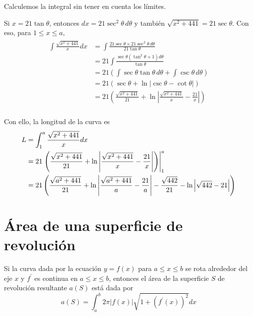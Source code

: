 Calculemos la integral sin tener en cuenta los límites.

Si $x=21\tan \theta$, entonces $dx=21\sec ^{2}\theta\,d\theta$ y también $\sqrt{x^{2}+441}=21\sec \theta$. Con eso, para $1\leq x\leq a$,
\begin{gather*}
  \begin{aligned}
    \int\frac{\sqrt{x^{2}+441}}{x}dx&=\int \frac{21\sec \theta \times 21\sec ^{2}\theta\,d\theta }{21 \tan\theta }\\
    &=21\int \frac{\sec \theta \left( \tan ^{2}\theta +1\right)
    d\theta }{\tan \theta } \\
    &=21\left( \int \sec \theta \tan \theta\,d\theta
    +\int \csc \theta\,d\theta \right)\\
    &=21\left( \sec \theta +\ln \left\vert \csc \theta -\cot \theta\right\vert \right)\\
    &=21\left( \frac{\sqrt{x^{2}+441}}{21}+\ln \left\vert \frac{\sqrt{x^{2}+441}}{x}-\frac{21}{x}\right\vert \right)\\
  \end{aligned}
\end{gather*}

Con ello, la longitud de la curva es
\begin{gather*}
  \begin{aligned}
    L&=\int_1^a\frac{\sqrt{x^{2}+441}}{x}dx\\
    &=21\left.\left( \frac{\sqrt{x^{2}+441}}{21}+\ln \left\vert \frac{\sqrt{x^{2}+441}}{x}-\frac{21}{x}\right\vert \right)\right\vert_{1}^{a}\\
    &=21\left( \frac{\sqrt{a^{2}+441}}{21}+\ln \left\vert \frac{\sqrt{%
      a^{2}+441}}{a}-\frac{21}{a}\right\vert - \frac{\sqrt{442}}{21}-\ln
    \left\vert \sqrt{442}-21\right\vert \right)
  \end{aligned}
\end{gather*}

\section{Área de una superficie de revolución}

Si la curva dada por la ecuación $y=f\left( x\right) $ para $a \leq x\leq b$ se rota alrededor del eje $x$ y $f^\prime $ es continua en $a \leq x\leq b $, entonces el área de la superficie $S$ de
revolución resultante $a\left( S\right) $ está dada por
\begin{equation}\label{AreaSuperfAlrx}
  a\left( S\right) =\int_{a}^{b}2\pi \vert f\left( x\right)\vert \sqrt{1+\left( f^\prime(x)\right) ^{2}}dx
\end{equation}

